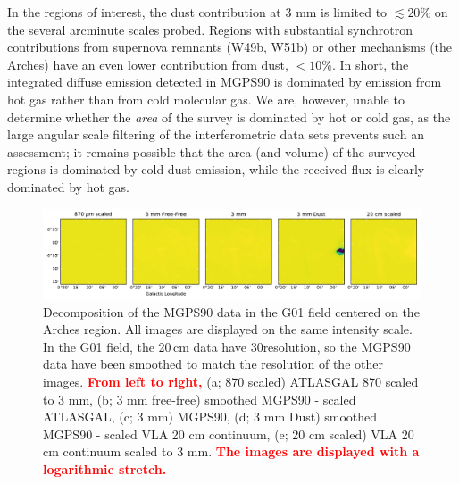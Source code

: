 \documentclass[twocolumn]{aastex62}
\def\edit#1{{\textcolor{red}{\textbf{#1}}}}
\begin{document}
In the regions of interest, the dust contribution at 3 mm is limited to
$\lesssim20\%$ on the several arcminute scales probed.  Regions with substantial
synchrotron contributions from supernova remnants (W49b, W51b) or other mechanisms
(the Arches) have an even lower contribution from dust, $<10\%$.  In short, the 
integrated diffuse emission detected in MGPS90 is dominated by emission from hot gas rather
than from cold molecular gas.  We are, however, unable to determine whether the \emph{area}
of the survey is dominated by hot or cold gas, as the large angular scale filtering of the
interferometric data sets prevents such an assessment; it remains possible that the area
(and volume) of the surveyed regions is dominated by cold dust emission, while the received
flux is clearly dominated by hot gas.






\begin{figure}[htp]
    \includegraphics[width=17cm]{figures/G01_arches_5panel.pdf}
    \caption{Decomposition of the MGPS90 data in the G01 field centered on the
    Arches region. 
    All images are displayed on the same intensity scale.  In the G01 field,
    the 20\,cm data have 30\arcsec resolution, so the MGPS90 data have been
    smoothed to match
    the resolution of the other images.
    \edit{From left to right,}
    (a; 870 \um scaled) ATLASGAL 870 \um scaled to 3 mm,
    (b; 3 mm free-free) smoothed MGPS90 - scaled ATLASGAL,
    (c; 3 mm) MGPS90,
    (d; 3 mm Dust) smoothed MGPS90 - scaled VLA 20 cm continuum,
    (e; 20 cm scaled) VLA 20 cm continuum scaled to 3 mm.
    \edit{The images are displayed with a logarithmic stretch.}
}
\label{fig:arches_freefree}
\end{figure}
\end{document}
